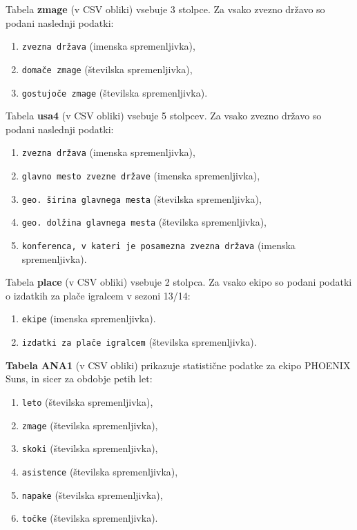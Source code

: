 \documentclass[11pt,a4paper]{article}
\begin{document}
\smallskip

Tabela \textbf{zmage} (v CSV obliki) vsebuje 3 stolpce. Za vsako zvezno državo so podani naslednji podatki:

\begin{enumerate}
\item{\verb|zvezna država| (imenska spremenljivka),}
\item{\verb|domače zmage| (številska spremenljivka),}
\item{\verb|gostujoče zmage| (številska spremenljivka).}
\end{enumerate}

\smallskip
Tabela \textbf{usa4} (v CSV obliki) vsebuje 5 stolpcev. Za vsako zvezno državo so podani naslednji podatki:

\begin{enumerate}
\item{\verb|zvezna država| (imenska spremenljivka),}
\item{\verb|glavno mesto zvezne države| (imenska spremenljivka),}
\item{\verb|geo. širina glavnega mesta| (številska spremenljivka),}
\item{\verb|geo. dolžina glavnega mesta| (številska spremenljivka),}
\item{\verb|konferenca, v kateri je posamezna zvezna država| (imenska spremenljivka).}
\end{enumerate}

\smallskip
Tabela \textbf{place} (v CSV obliki) vsebuje 2 stolpca. Za vsako ekipo so podani podatki o izdatkih za plače igralcem v sezoni 13/14:

\begin{enumerate}
\item{\verb|ekipe| (imenska spremenljivka).}
\item{\verb|izdatki za plače igralcem| (številska spremenljivka).}
\end{enumerate}

\smallskip
\textbf{Tabela ANA1} (v CSV obliki) prikazuje statistične podatke za ekipo PHOENIX Suns, in sicer za obdobje petih let:

\begin{enumerate}
\item{\verb|leto| (številska spremenljivka),}
\item{\verb|zmage| (številska spremenljivka),}
\item{\verb|skoki| (številska spremenljivka),}
\item{\verb|asistence| (številska spremenljivka),}
\item{\verb|napake| (številska spremenljivka),}
\item{\verb|točke| (številska spremenljivka).}
\end{enumerate}
\end{document}
